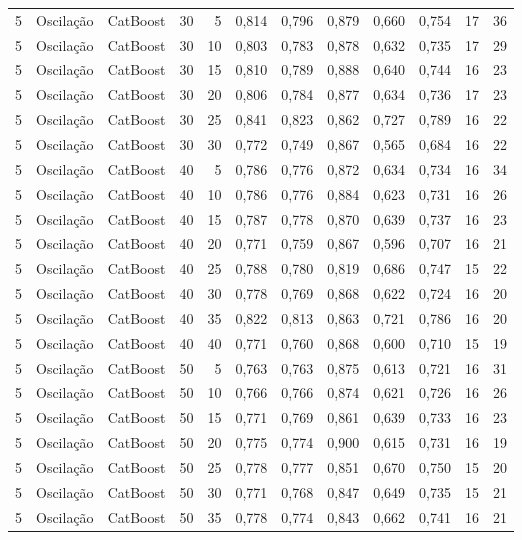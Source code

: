 \begin{longtable}{@{}rllrrrrrrrrr@{}}
5 & Oscilação & CatBoost & 30 & 5 & 0,814 & 0,796 & 0,879 & 0,660 & 0,754 & 17 & 36 \\
5 & Oscilação & CatBoost & 30 & 10 & 0,803 & 0,783 & 0,878 & 0,632 & 0,735 & 17 & 29 \\
5 & Oscilação & CatBoost & 30 & 15 & 0,810 & 0,789 & 0,888 & 0,640 & 0,744 & 16 & 23 \\
5 & Oscilação & CatBoost & 30 & 20 & 0,806 & 0,784 & 0,877 & 0,634 & 0,736 & 17 & 23 \\
5 & Oscilação & CatBoost & 30 & 25 & 0,841 & 0,823 & 0,862 & 0,727 & 0,789 & 16 & 22 \\
5 & Oscilação & CatBoost & 30 & 30 & 0,772 & 0,749 & 0,867 & 0,565 & 0,684 & 16 & 22 \\
5 & Oscilação & CatBoost & 40 & 5 & 0,786 & 0,776 & 0,872 & 0,634 & 0,734 & 16 & 34 \\
5 & Oscilação & CatBoost & 40 & 10 & 0,786 & 0,776 & 0,884 & 0,623 & 0,731 & 16 & 26 \\
5 & Oscilação & CatBoost & 40 & 15 & 0,787 & 0,778 & 0,870 & 0,639 & 0,737 & 16 & 23 \\
5 & Oscilação & CatBoost & 40 & 20 & 0,771 & 0,759 & 0,867 & 0,596 & 0,707 & 16 & 21 \\
5 & Oscilação & CatBoost & 40 & 25 & 0,788 & 0,780 & 0,819 & 0,686 & 0,747 & 15 & 22 \\
5 & Oscilação & CatBoost & 40 & 30 & 0,778 & 0,769 & 0,868 & 0,622 & 0,724 & 16 & 20 \\
5 & Oscilação & CatBoost & 40 & 35 & 0,822 & 0,813 & 0,863 & 0,721 & 0,786 & 16 & 20 \\
5 & Oscilação & CatBoost & 40 & 40 & 0,771 & 0,760 & 0,868 & 0,600 & 0,710 & 15 & 19 \\
5 & Oscilação & CatBoost & 50 & 5 & 0,763 & 0,763 & 0,875 & 0,613 & 0,721 & 16 & 31 \\
5 & Oscilação & CatBoost & 50 & 10 & 0,766 & 0,766 & 0,874 & 0,621 & 0,726 & 16 & 26 \\
5 & Oscilação & CatBoost & 50 & 15 & 0,771 & 0,769 & 0,861 & 0,639 & 0,733 & 16 & 23 \\
5 & Oscilação & CatBoost & 50 & 20 & 0,775 & 0,774 & 0,900 & 0,615 & 0,731 & 16 & 19 \\
5 & Oscilação & CatBoost & 50 & 25 & 0,778 & 0,777 & 0,851 & 0,670 & 0,750 & 15 & 20 \\
5 & Oscilação & CatBoost & 50 & 30 & 0,771 & 0,768 & 0,847 & 0,649 & 0,735 & 15 & 21 \\
5 & Oscilação & CatBoost & 50 & 35 & 0,778 & 0,774 & 0,843 & 0,662 & 0,741 & 16 & 21 \\

\end{longtable}
